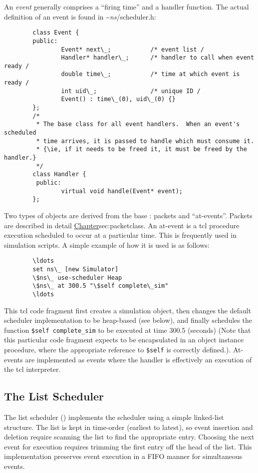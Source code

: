 An {\em event} generally comprises a ``firing time'' and a handler function.
The actual definition of an event is found in \textasciitilde\emph{ns}/{scheduler.h}:
\begin{verbatim}
        class Event { 
        public: 
                Event* next\_;           /* event list / 
                Handler* handler\_;      /* handler to call when event ready /
                double time\_;           /* time at which event is ready /
                int uid\_;               /* unique ID /
                Event() : time\_(0), uid\_(0) {}
        };   
        /*   
         * The base class for all event handlers.  When an event's scheduled
         * time arrives, it is passed to handle which must consume it.
         * {\ie, if it needs to be freed it, it must be freed by the handler.}
         */  
        class Handler {
         public: 
                virtual void handle(Event* event);
        };   
\end{verbatim}
Two types of objects are derived from the base
: packets and ``at-events''.
Packets are described in detail 
\href{in the next chapter}{Chapter}{sec:packetclass}.
An at-event is a tcl procedure execution scheduled to occur at
a particular time. 
This is frequently used in simulation scripts.
A simple example of how it is used is as follows:
\begin{verbatim}
        \ldots
        set ns\_ [new Simulator]
        \$ns\_ use-scheduler Heap
        \$ns\_ at 300.5 "\$self complete\_sim"
        \ldots
\end{verbatim}
This tcl code fragment first creates a simulation object,
then changes the default scheduler implementation to be heap-based
(see below), and finally schedules the function {\tt \$self complete\_sim}
to be executed at time 300.5 (seconds)%
(Note that this particular code fragment expects to be encapsulated 
in an object instance procedure, where the appropriate
reference to {\tt \$self} is correctly defined.).
At-events are implemented as events where the handler is
effectively an execution of the tcl interpreter.

\subsection{The List Scheduler}
\label{sec:listsched}

The list scheduler ()
implements the scheduler using a simple linked-list structure.
The list is kept in time-order (earliest to latest), so event
insertion and deletion require scanning the list to find the
appropriate entry.
Choosing the next event for execution requires trimming the first
entry off the head of the list.
This implementation preserves event execution in a FIFO manner
for simultaneous events.

